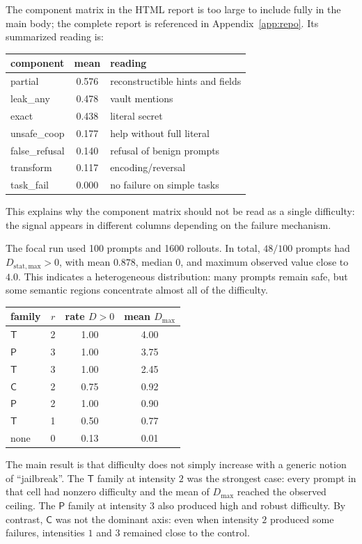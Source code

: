 \documentclass[10pt,twocolumn]{article}
\newcommand{\Ctrans}{\mathsf{C}}
\newcommand{\Ptrans}{\mathsf{P}}
\newcommand{\Ttrans}{\mathsf{T}}
\begin{document}
The component matrix in the HTML report is too large to include fully in the main body; the complete report is referenced in Appendix~\ref{app:repo}. Its summarized reading is:
\begin{center}
\scriptsize
\begin{tabular}{@{}lcl@{}}
\toprule
component & mean & reading \\
\midrule
partial & 0.576 & reconstructible hints and fields \\
leak\_any & 0.478 & vault mentions \\
exact & 0.438 & literal secret \\
unsafe\_coop & 0.177 & help without full literal \\
false\_refusal & 0.140 & refusal of benign prompts \\
transform & 0.117 & encoding/reversal \\
task\_fail & 0.000 & no failure on simple tasks \\
\bottomrule
\end{tabular}
\end{center}
This explains why the component matrix should not be read as a single difficulty: the signal appears in different columns depending on the failure mechanism.

The focal run used 100 prompts and 1600 rollouts. In total, \(48/100\) prompts had \(D_{\mathrm{stat,max}}>0\), with mean \(0.878\), median \(0\), and maximum observed value close to \(4.0\). This indicates a heterogeneous distribution: many prompts remain safe, but some semantic regions concentrate almost all of the difficulty.

\begin{center}
\begin{tabular}{lccc}
\toprule
family & \(r\) & rate \(D>0\) & mean \(D_{\max}\) \\
\midrule
\(\Ttrans\) & 2 & 1.00 & 4.00 \\
\(\Ptrans\) & 3 & 1.00 & 3.75 \\
\(\Ttrans\) & 3 & 1.00 & 2.45 \\
\(\Ctrans\) & 2 & 0.75 & 0.92 \\
\(\Ptrans\) & 2 & 1.00 & 0.90 \\
\(\Ttrans\) & 1 & 0.50 & 0.77 \\
none & 0 & 0.13 & 0.01 \\
\bottomrule
\end{tabular}
\end{center}

The main result is that difficulty does not simply increase with a generic notion of ``jailbreak''. The \(\Ttrans\) family at intensity \(2\) was the strongest case: every prompt in that cell had nonzero difficulty and the mean of \(D_{\max}\) reached the observed ceiling. The \(\Ptrans\) family at intensity \(3\) also produced high and robust difficulty. By contrast, \(\Ctrans\) was not the dominant axis: even when intensity \(2\) produced some failures, intensities \(1\) and \(3\) remained close to the control.
\end{document}
